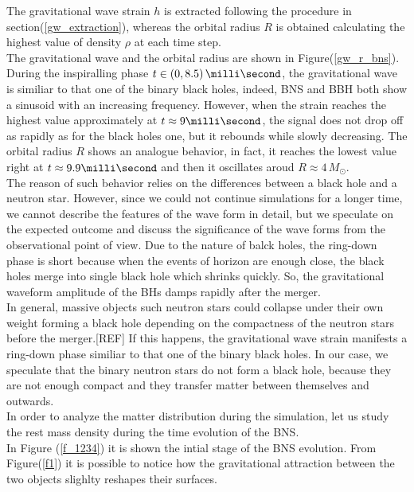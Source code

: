 The gravitational wave strain $h$ is extracted following the procedure in section(\ref{gw_extraction}), whereas the orbital radius $R$ is obtained calculating the highest value of density $\rho$ at each time step.\\
The gravitational wave and the orbital radius are shown in Figure(\ref{gw_r_bns}).
During the inspiralling phase $t \in (0, 8.5) \, \milli \second$, the gravitational wave is similiar to that one of the binary black holes, indeed, BNS and BBH both show a sinusoid with an increasing frequency.
However, when the strain reaches the highest value approximately at $t\approx 9 \milli \second$, the signal does not drop off as rapidly as for the black holes one, but it rebounds while slowly decreasing.
The orbital radius $R$ shows an analogue behavior, in fact, it reaches the lowest value right at $t \approx 9.9 \milli \second$ and then it oscillates aroud $R \approx 4 \, M _{\odot}$.\\
The reason of such behavior relies on the differences between a black hole and a neutron star.
However, since we could not continue simulations for a longer time, we cannot describe the features of the wave form in detail, but we speculate on the expected outcome and discuss the significance of the wave forms from the observational point of view.
Due to the nature of balck holes,  the ring-down phase is short because when the events of horizon are enough close, the black holes merge into single black hole which shrinks quickly.
So, the gravitational waveform amplitude of the BHs damps rapidly after the merger.\\
In general, massive objects such neutron stars could collapse under their own weight forming a black hole depending on the compactness of the neutron stars before the merger.[REF]%
If this happens, the gravitational wave strain manifests a ring-down phase similiar to that one of the binary black holes.
In our case, we speculate that the binary neutron stars do not form a black hole, because they are not enough compact and they transfer matter between themselves and outwards.\\
 In order to analyze the matter distribution during the simulation, let us study the rest mass density during the time evolution of the BNS.\\
In Figure (\ref{f_1234}) it is shown the intial stage of the BNS evolution.
From Figure(\ref{f1}) it is possible to notice how the gravitational attraction between the two objects slighlty reshapes their surfaces.
